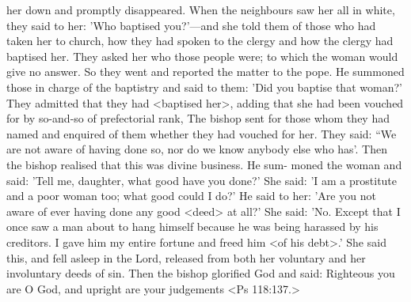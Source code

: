 her down and promptly disappeared.
When the neighbours saw her
all in white, they said to her: 'Who baptised you?'—and she told
them of those who had taken her to church, how they had spoken
to the clergy and how the clergy had baptised her.
They asked her
who those people were; to which the woman would give no answer.
So they went and reported the matter to the pope.
He summoned
those in charge of the baptistry and said to them: 'Did you baptise
that woman?' They admitted that they had <baptised her>, adding
that she had been vouched for by so-and-so of prefectorial rank,
The bishop sent for those whom they had named and enquired of
them whether they had vouched for her.
They said: “We are not
aware of having done so, nor do we know anybody else who has'.
Then the bishop realised that this was divine business.
He sum-
moned the woman and said: 'Tell me, daughter, what good have
you done?' She said: 'I am a prostitute and a poor woman too; what
good could I do?' He said to her: 'Are you not aware of ever having
done any good <deed> at all?' She said: 'No.
Except that I once
saw a man about to hang himself because he was being harassed by
his creditors.
I gave him my entire fortune and freed him <of his
debt>.' She said this, and fell asleep in the Lord, released from both
her voluntary and her involuntary deeds of sin.
Then the bishop
glorified God and said: Righteous you are O God, and upright are
your judgements <Ps 118:137.>

